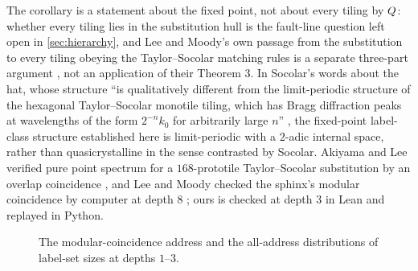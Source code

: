 
The corollary is a statement about the fixed point, not about every tiling by $Q$: whether
every tiling lies in the substitution hull is the fault-line question left open in
\cref{sec:hierarchy}, and Lee and Moody's own passage from the substitution to every tiling
obeying the Taylor--Socolar matching rules is a separate three-part argument \cite{LM13}, not
an application of their Theorem 3. In Socolar's words about the hat, whose structure ``is
qualitatively different from the limit-periodic structure of the hexagonal Taylor--Socolar
monotile tiling, which has Bragg diffraction peaks at wavelengths of the form $2^{-n}k_0$ for
arbitrarily large $n$'' \cite{Soc23}, the fixed-point label-class structure established here is
limit-periodic with a $2$-adic internal space, rather than quasicrystalline in the sense
contrasted by Socolar.
Akiyama and Lee verified pure point spectrum for a $168$-prototile Taylor--Socolar substitution by
an overlap coincidence \cite{AL14}, and Lee and Moody checked the sphinx's modular coincidence by
computer at depth $8$ \cite{LM01}; ours is checked at depth $3$ in Lean and replayed in Python.

\begin{figure}[ht]
  \centering
  
  \caption{The modular-coincidence address and the all-address distributions of label-set sizes
  at depths $1$--$3$.}
  \label{fig:coincidence}
\end{figure}
